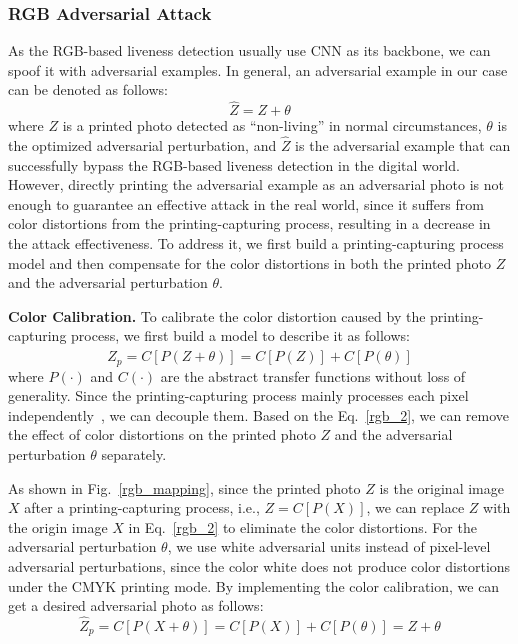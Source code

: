 \subsubsection{RGB Adversarial Attack}
As the RGB-based liveness detection usually use CNN as its backbone, we can spoof it with adversarial examples. In general, an adversarial example in our case can be denoted as follows: 
\begin{equation}
	\widehat{Z} = Z+\theta \label{rgb_1}
\end{equation}
where $Z$ is a printed photo detected as ``non-living''  in normal circumstances,  $\theta$ is the optimized adversarial perturbation, and  $\widehat{Z}$ is the adversarial example that can successfully bypass the RGB-based liveness detection in the digital world. However, directly printing the adversarial example as
 an adversarial photo is not enough to guarantee an effective
 attack in the real world, since it suffers from color distortions
 from the printing-capturing process, resulting in a decrease
in the attack effectiveness.  To address it, we first build a printing-capturing
process model and then compensate for the color distortions
in both the printed photo $Z$ and the adversarial perturbation $\theta$.

\textbf{Color Calibration.}
To calibrate the color distortion caused by the printing-capturing process, we first build a model to describe it as follows:
\begin{equation}
	\widehat{Z}_p=C[P(Z+\theta)] =C[P(Z)]+C[P(\theta)]\label{rgb_2}
\end{equation}
where $P(\cdot)$ and $C(\cdot)$ are the abstract transfer functions without loss of generality. Since the printing-capturing process mainly processes each pixel independently~\cite{yin2013image}, we can decouple them. Based on the Eq.~\ref{rgb_2}, we can remove the effect of color distortions on the printed photo $Z$ and the adversarial perturbation $\theta$ separately.

As shown in Fig.~\ref{rgb_mapping}, since the printed photo $Z$ is the original image $X$ after a printing-capturing process, i.e., $Z=C[P(X)]$, we can replace $Z$ with the origin image $X$ in Eq.~\ref{rgb_2} to eliminate the color distortions. For the adversarial perturbation $\theta$, we use white adversarial units instead of pixel-level adversarial perturbations, since the color white does not produce color distortions under the CMYK printing mode. 
By implementing the color calibration, we can get a desired adversarial photo as follows:
\begin{equation}
	\widehat{Z}_p=C[P(X+\theta)] =C[P(X)]+C[P(\theta)]=Z+\theta\label{rgb_3}
\end{equation}

